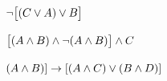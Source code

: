 \begin{compactlist}
\item $\neg\bigl[(C\vee A) \vee B\bigr]$\vspace{.5ex}
%
%
%

\item $\bigl[(A\wedge B) \wedge\neg(A\wedge B)\bigr] \wedge C$ \vspace{.5ex}
%
%
%
%
%
\item $(A \wedge B) ]\rightarrow[(A \wedge C) \vee (B \wedge D)]$ \vspace{.5ex}
%
%
%
\end{compactlist}

